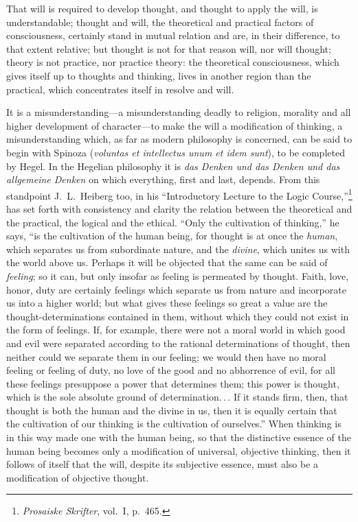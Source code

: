 \documentclass[12pt,a4paper]{article}
\newcommand{\opage}[1]{\marginnote{\footnotesize\textit{[#1]}}}
\begin{document}
That will is required to develop thought, and thought to apply the
will, is understandable; thought and will, the theoretical and
practical factors of consciousness, certainly stand in mutual relation
and
\opage{67}are, in their difference, to that extent relative; but
thought is not for that reason will, nor will thought; theory is not
practice, nor practice theory: the theoretical consciousness, which
gives itself up to thoughts and thinking, lives in another region than
the practical, which concentrates itself in resolve and will.

It is a misunderstanding---a misunderstanding deadly to religion,
morality and all higher development of character---to make the will a
modification of thinking, a misunderstanding which, as far as modern
philosophy is concerned, can be said to begin with Spinoza
(\textit{voluntas et intellectus unum et idem sunt}), to be completed
by Hegel. In the Hegelian philosophy it is \textit{das Denken und das
Denken und das allgemeine Denken} on which everything, first and last,
depends. From this standpoint J.\ L.\ Heiberg too, in his
``Introductory Lecture to the Logic Course,''\footnote{%
\emph{Prosaiske Skrifter}, vol.~I, p.~465.}
has set forth with consistency and clarity the relation between the
theoretical and the practical, the logical and the ethical. ``Only the
cultivation of thinking,'' he says, ``is the cultivation of the human
being, for thought is at once the \emph{human}, which separates us
from subordinate nature, and the \emph{divine}, which unites us with
the world above us. Perhaps it will be objected that the same can be
said of \emph{feeling}; so it can, but only insofar as feeling is
permeated by thought. Faith, love, honor, duty are certainly feelings
which separate us from nature and incorporate us into a higher world;
but what gives these feelings so great a value are the
thought-determinations contained in them, without which they could
not exist in the form of feelings. If, for example, there were not a
moral world in which good and evil were separated according to the
rational determinations of thought, then neither could we separate
them in our feeling; we would then have no
\opage{68}moral feeling or feeling of duty, no love of the good and no
abhorrence of evil, for all these feelings presuppose a power that
determines them; this power is thought, which is the sole absolute
ground of determination.\,.\,.
If it stands firm, then, that thought is both the human and the
divine in us, then it is equally certain that the cultivation of our
thinking is the cultivation of ourselves.''
When thinking is in this way made one with the human being, so that
the distinctive essence of the human being becomes only a
modification of universal, objective thinking, then it follows of
itself that the will, despite its subjective essence, must also be a
modification of objective thought.
\end{document}
